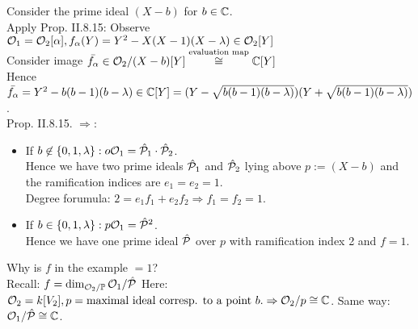 \begin{Bem}
Consider the prime ideal $(X-b)$ for $b \in \mathbb{C}$.\\
Apply Prop. II.8.15: Observe $\mathcal{O}_1=\mathcal{O}_2[\alpha], f_\alpha(Y)=Y^2-X(X-1)(X-\lambda) \in \mathcal{O}_2[Y]$\\
Consider image $\bar{f_\alpha} \in \mathcal{O}_2/(X-b) [Y] \stackrel{\text{evaluation map}}{\cong} \mathbb{C} [Y]$\\
Hence $\bar{f_\alpha}=Y^2-b(b-1)(b-\lambda) \in \mathbb{C}[Y]=(Y- \sqrt{b(b-1)(b-\lambda)})(Y+\sqrt{b(b-1)(b-\lambda)})$.\\
Prop. II.8.15. $\Rightarrow:$
\begin{itemize}
\item If $b \not \in \{0,1,\lambda\}: o\mathcal{O}_1=\hat{\mathcal{P}}_1 \cdot \hat{\mathcal{P}}_2$.\\
Hence we have two prime ideals $\hat{\mathcal{P}}_1$ and $\hat{\mathcal{P}}_2$ lying above $p:=(X-b)$ and the ramification indices are $e_1=e_2=1$.\\
Degree forumula: $2=e_1f_1+e_2f_2 \Rightarrow f_1=f_2=1$.
\item If $b \in \{0,1,\lambda\}: p\mathcal{O}_1=\hat{\mathcal{P}}^2$.\\
Hence we have one prime ideal $\hat{\mathcal{P}}$ over $p$ with ramification index 2 and $f=1$.
\end{itemize}
\end{Bem}

\begin{Bem}
Why is $f$ in the example $=1$?\\
Recall: $f= \dim_{\mathcal{O}_2/\mathbb{P}} \mathcal{O}_1/\hat{\mathcal{P}}$ Here: $\mathcal{O}_2=k[V_2], p=\text{maximal ideal corresp. to a point } b. \Rightarrow \mathcal{O}_2/p\cong \mathbb{C}$. Same way: $\mathcal{O}_1/\hat{\mathcal{P}} \cong \mathbb{C}$.
\end{Bem}